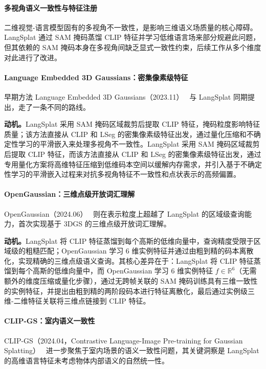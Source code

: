 \paragraph{多视角语义一致性与特征注册}

二维视觉-语言模型固有的多视角不一致性，是影响三维语义场质量的核心障碍。LangSplat 通过 SAM 掩码蒸馏 CLIP 特征并学习低维语言场来部分规避此问题，但其依赖的 SAM 掩码本身在多视角间缺乏显式一致性约束，后续工作从多个维度对此进行了改进。

\paragraph{Language Embedded 3D Gaussians：密集像素级特征} 早期方法 Language Embedded 3D Gaussians（2023.11）~\cite{2311_18482} 与 LangSplat 同期提出，走了一条不同的路线。

\textbf{动机。}LangSplat 采用 SAM 掩码区域裁剪后提取 CLIP 特征，掩码粒度影响特征质量；该方法直接从 CLIP 和 LSeg 的密集像素级特征出发，通过量化压缩和不确定性学习的平滑嵌入来处理多视角不一致性。LangSplat 采用 SAM 掩码区域裁剪后提取 CLIP 特征，而该方法直接从 CLIP 和 LSeg 的密集像素级特征出发，通过专用量化方案将高维特征压缩到低维码本空间以缓解内存需求，并引入基于不确定性学习的平滑嵌入过程来对抗多视角特征不一致性和点状表示的高频偏置。

\paragraph{OpenGaussian：三维点级开放词汇理解} OpenGaussian（2024.06）~\cite{2406_02058} 则在表示粒度上超越了 LangSplat 的区域级查询能力，首次实现基于 3DGS 的三维点级开放词汇理解。

\textbf{动机。}LangSplat 将 CLIP 特征蒸馏到每个高斯的低维向量中，查询精度受限于区域级的粗糙匹配；OpenGaussian 学习 6 维实例特征并通过由粗到精的码本离散化，实现精确的三维点级语义查询。其核心差异在于：LangSplat 将 CLIP 特征蒸馏到每个高斯的低维向量中，而 OpenGaussian 学习 6 维实例特征 $f \in \mathbb{R}^6$（无需额外的维度压缩或量化步骤），通过无跨帧关联的 SAM 掩码训练具有三维一致性的实例特征，并提出由粗到精的两阶段码本进行特征离散化，最后通过实例级三维-二维特征关联将三维点链接到 CLIP 特征。

\paragraph{CLIP-GS：室内语义一致性} CLIP-GS（2024.04，Contrastive Language-Image Pre-training for Gaussian Splatting）~\cite{2404_14249} 进一步聚焦于室内场景的语义一致性问题，其关键洞察是 LangSplat 的高维语言特征未考虑物体内部语义的自然统一性。

